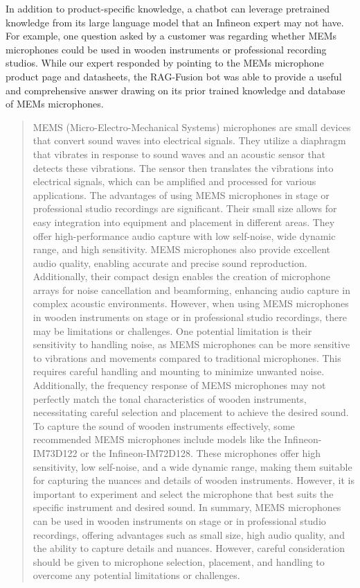 \documentclass{article}
\begin{document}
In addition to product-specific knowledge, a chatbot can leverage pretrained knowledge from its large language model that an Infineon expert may not have. For example, one question asked by a customer was regarding whether MEMs microphones could be used in wooden instruments or professional recording studios. While our expert responded by pointing to the MEMs microphone product page and datasheets, the RAG-Fusion bot was able to provide a useful and comprehensive answer drawing on its prior trained knowledge and database of MEMs microphones.
\begin{quote}
MEMS (Micro-Electro-Mechanical Systems) microphones are small devices that convert sound waves into electrical signals. They utilize a diaphragm that vibrates in response to sound waves and an acoustic sensor that detects these vibrations. The sensor then translates the vibrations into electrical signals, which can be amplified and processed for various applications. \newline
The advantages of using MEMS microphones in stage or professional studio recordings are significant. Their small size allows for easy integration into equipment and placement in different areas. They offer high-performance audio capture with low self-noise, wide dynamic range, and high sensitivity. MEMS microphones also provide excellent audio quality, enabling accurate and precise sound reproduction. Additionally, their compact design enables the creation of microphone arrays for noise cancellation and beamforming, enhancing audio capture in complex acoustic environments. \newline
However, when using MEMS microphones in wooden instruments on stage or in professional studio recordings, there may be limitations or challenges. One potential limitation is their sensitivity to handling noise, as MEMS microphones can be more sensitive to vibrations and movements compared to traditional microphones. This requires careful handling and mounting to minimize unwanted noise. Additionally, the frequency response of MEMS microphones may not perfectly match the tonal characteristics of wooden instruments, necessitating careful selection and placement to achieve the desired sound. \newline
To capture the sound of wooden instruments effectively, some recommended MEMS microphones include models like the Infineon-IM73D122 or the Infineon-IM72D128. These microphones offer high sensitivity, low self-noise, and a wide dynamic range, making them suitable for capturing the nuances and details of wooden instruments. However, it is important to experiment and select the microphone that best suits the specific instrument and desired sound. \newline
In summary, MEMS microphones can be used in wooden instruments on stage or in professional studio recordings, offering advantages such as small size, high audio quality, and the ability to capture details and nuances. However, careful consideration should be given to microphone selection, placement, and handling to overcome any potential limitations or challenges.
\end{quote}
\end{document}
